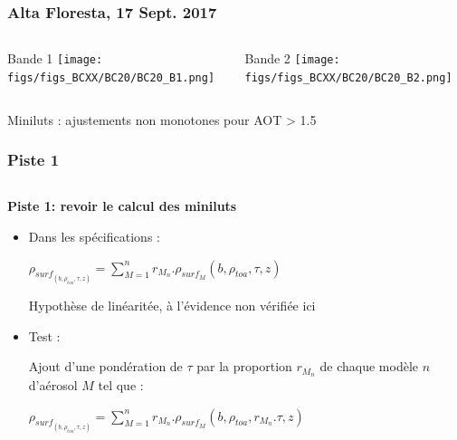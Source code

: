 \documentclass[8pt]{beamer}
\begin{document}
\begin{frame}
\frametitle{Alta Floresta, 17 Sept. 2017}
	
	\begin{columns}
		\begin{column}{0.5\textwidth}
			\begin{center}
				Bande 1
		     	\texttt{[image: figs/figs\_BCXX/BC20/BC20\_B1.png]}
		    \end{center}		
		\end{column}
		\begin{column}{0.5\textwidth}
			\begin{center}
				Bande 2
				\texttt{[image: figs/figs\_BCXX/BC20/BC20\_B2.png]}
		    \end{center}		
		\end{column}
	\end{columns}
	Miniluts : ajustements non monotones pour AOT > 1.5
\end{frame}

\begin{frame}
\frametitle{Piste 1}
	\begin{columns}
		\begin{column}{0.7\textwidth}
			\textbf{Piste 1: revoir le calcul des miniluts}
			
			\begin{itemize}			
			\item Dans les spécifications :
			
			$\rho_{surf_{(b,\rho_{toa},\tau,z)}} = \sum\limits_{M=1}^n r_{M_{n}}.\rho_{surf_{M}}(b,\rho_{toa},\tau,z)$
			
			Hypothèse de linéaritée, à l'évidence non vérifiée ici
			
			\item Test :
			
			Ajout d'une pondération de $\tau$ par la proportion $r_{M_{n}}$ de chaque modèle $n$ d'aérosol $M$ tel que :
			
			$\rho_{surf_{(b,\rho_{toa},\tau,z)}} = \sum\limits_{M=1}^n r_{M_{n}}.\rho_{surf_{M}}(b,\rho_{toa},r_{M_{n}}.\tau,z)$
			\end{itemize}
		\end{column}
		
	\end{columns}
\end{frame}
\end{document}
